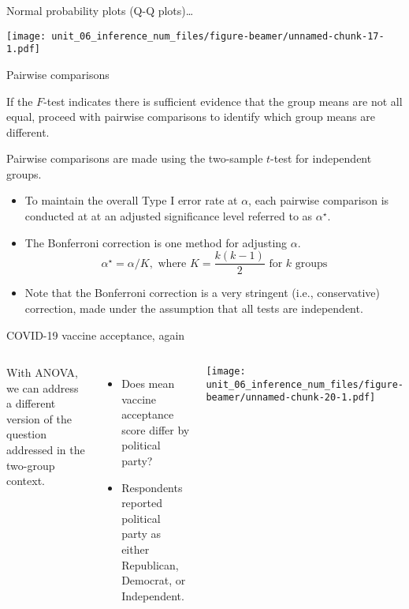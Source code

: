\documentclass[
  ignorenonframetext,
  aspectratio=169]{beamer}
\newcommand{\columnsbegin}{\begin{columns}}
\newcommand{\columnsend}{\end{columns}}
\begin{document}
\begin{frame}{Normal probability plots (Q-Q plots)\ldots{}}
\protect\hypertarget{normal-probability-plots-q-q-plots-1}{}
\scriptsize

\texttt{[image: unit\_06\_inference\_num\_files/figure-beamer/unnamed-chunk-17-1.pdf]}
\end{frame}

\begin{frame}{Pairwise comparisons}
\protect\hypertarget{pairwise-comparisons}{}
\small

If the \(F\)-test indicates there is sufficient evidence that the group
means are not all equal, proceed with pairwise comparisons to identify
which group means are different.

Pairwise comparisons are made using the two-sample \(t\)-test for
independent groups.

\begin{itemize}
\item
  To maintain the overall Type I error rate at \(\alpha\), each pairwise
  comparison is conducted at at an adjusted significance level referred
  to as \(\alpha^\star\).
\item
  The Bonferroni correction is one method for adjusting \(\alpha\).
  \[\alpha^\star = \alpha/K, \text{ where } K = \frac{k(k-1)}{2} \text{ for $k$ groups}\]
\item
  Note that the Bonferroni correction is a very stringent (i.e.,
  conservative) correction, made under the assumption that all tests are
  independent.
\end{itemize}
\end{frame}

\begin{frame}{COVID-19 vaccine acceptance, again}
\protect\hypertarget{covid-19-vaccine-acceptance-again}{}
\columnsbegin


\footnotesize

With ANOVA, we can address a different version of the question addressed
in the two-group context.

\begin{itemize}
\item
  Does mean vaccine acceptance score differ by political party?
\item
  Respondents reported political party as either Republican, Democrat,
  or Independent.
\end{itemize}


\scriptsize

\texttt{[image: unit\_06\_inference\_num\_files/figure-beamer/unnamed-chunk-20-1.pdf]}

\columnsend
\end{frame}
\end{document}
